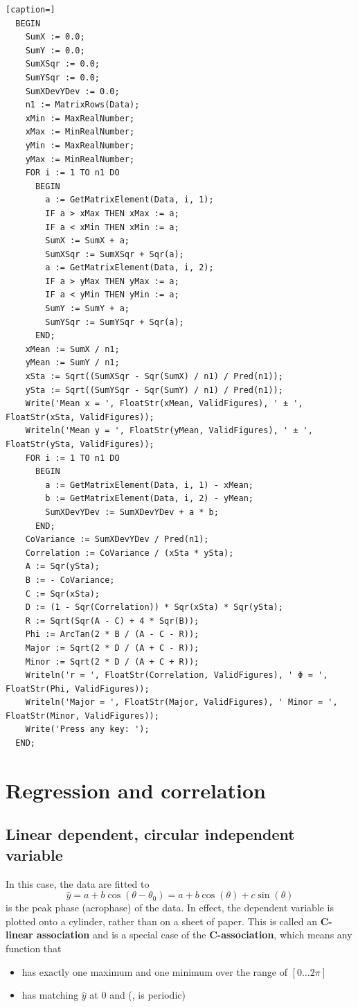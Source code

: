 \begin{refsection}
\begin{lstlisting}[caption=]
  BEGIN
    SumX := 0.0;
    SumY := 0.0;
    SumXSqr := 0.0;
    SumYSqr := 0.0;
    SumXDevYDev := 0.0;
    n1 := MatrixRows(Data);
    xMin := MaxRealNumber;
    xMax := MinRealNumber;
    yMin := MaxRealNumber;
    yMax := MinRealNumber;
    FOR i := 1 TO n1 DO
      BEGIN
        a := GetMatrixElement(Data, i, 1);
        IF a > xMax THEN xMax := a;
        IF a < xMin THEN xMin := a;
        SumX := SumX + a;
        SumXSqr := SumXSqr + Sqr(a);
        a := GetMatrixElement(Data, i, 2);
        IF a > yMax THEN yMax := a;
        IF a < yMin THEN yMin := a;
        SumY := SumY + a;
        SumYSqr := SumYSqr + Sqr(a);
      END;
    xMean := SumX / n1;
    yMean := SumY / n1;
    xSta := Sqrt((SumXSqr - Sqr(SumX) / n1) / Pred(n1));
    ySta := Sqrt((SumYSqr - Sqr(SumY) / n1) / Pred(n1));
    Write('Mean x = ', FloatStr(xMean, ValidFigures), ' ± ', FloatStr(xSta, ValidFigures));
    Writeln('Mean y = ', FloatStr(yMean, ValidFigures), ' ± ', FloatStr(ySta, ValidFigures));
    FOR i := 1 TO n1 DO
      BEGIN
        a := GetMatrixElement(Data, i, 1) - xMean;
        b := GetMatrixElement(Data, i, 2) - yMean;
        SumXDevYDev := SumXDevYDev + a * b;
      END;
    CoVariance := SumXDevYDev / Pred(n1);
    Correlation := CoVariance / (xSta * ySta);
    A := Sqr(ySta);
    B := - CoVariance;
    C := Sqr(xSta);
    D := (1 - Sqr(Correlation)) * Sqr(xSta) * Sqr(ySta);
    R := Sqrt(Sqr(A - C) + 4 * Sqr(B));
    Phi := ArcTan(2 * B / (A - C - R));
    Major := Sqrt(2 * D / (A + C - R));
    Minor := Sqrt(2 * D / (A + C + R));
    Writeln('r = ', FloatStr(Correlation, ValidFigures), ' Φ = ', FloatStr(Phi, ValidFigures));
    Writeln('Major = ', FloatStr(Major, ValidFigures), ' Minor = ', FloatStr(Minor, ValidFigures));
    Write('Press any key: ');
  END;
\end{lstlisting}

\section{Regression and correlation}

\subsection{Linear dependent, circular independent variable}

In this case, the data are fitted to
\begin{equation}
  \hat{y} = a + b \cos(\theta - \theta_0) = a + b \cos(\theta) + c \sin(\theta)
\end{equation}
 is the peak phase (acrophase) of the data. In effect, the dependent variable is plotted onto a cylinder, rather than on a sheet of paper. This is called an \textbf{C-linear association} and is a special case of the \textbf{C-association}, which means any function that
\begin{itemize}
  \item{has exactly one maximum and one minimum over the range of \( [0\ldots 2\pi] \)}
  \item{has matching \(\hat{y}\) at \num{0} and \skalar{2\pi} (, is periodic)}
\end{itemize}


\end{refsection}
